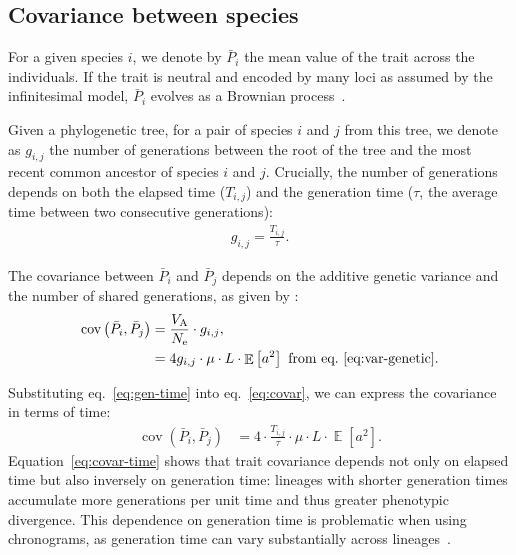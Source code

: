 \documentclass{article}
\newcommand{\Multiply}{\cdot}
\DeclareMathOperator{\E}{\mathbb{E}}
\DeclareMathOperator{\Cov}{\text{cov}}
\newcommand{\Ne}{N_{\text{e}}}
\newcommand{\Trait}{P}
\newcommand{\MutationRatePheno}{\mu}
\newcommand{\NbrLoci}{L}
\newcommand{\Spi}{i}
\newcommand{\Spj}{j}
\newcommand{\Time}{T}
\newcommand{\GenerationTime}{\tau}
\newcommand{\NbrGen}{g_{\Spi, \Spj}}
\newcommand{\VarGenetic}{V_{\mathrm{A}}}
\newcommand{\MeanTrait}{\bar{\Trait}}
\newcommand{\VarPhy}{\Cov \left( \MeanTrait_{\Spi}, \MeanTrait_{\Spj}\right)}
\newcommand{\GenArchi}{\NbrLoci \Multiply \E \left[ a^2 \right]}
\begin{document}
\subsection{Covariance between species}

For a given species $\Spi$, we denote by $\MeanTrait_{\Spi}$ the mean value of the trait across the individuals.
If the trait is neutral and encoded by many loci as assumed by the infinitesimal model, $\MeanTrait_{\Spi}$ evolves as a Brownian process~\citep{felsenstein_phylogenies_1985, hansen_translating_1996}.

Given a phylogenetic tree, for a pair of species $\Spi$ and $\Spj$ from this tree, we denote as $\NbrGen$ the number of generations between the root of the tree and the most recent common ancestor of species $\Spi$ and $\Spj$.
Crucially, the number of generations depends on both the elapsed time ($\Time_{\Spi, \Spj}$) and the generation time ($\GenerationTime$, the average time between two consecutive generations):
\begin{align}
    \NbrGen = \frac{\Time_{\Spi, \Spj}}{\GenerationTime}. \label{eq:gen-time}
\end{align}

The covariance between $\MeanTrait_{\Spi}$ and $\MeanTrait_{\Spj}$ depends on the additive genetic variance and the number of shared generations, as given by \citet{hansen_translating_1996}:
\begin{align}
    \VarPhy & = \frac{\VarGenetic}{\Ne} \Multiply \NbrGen, \\
    & = 4 \NbrGen \Multiply \MutationRatePheno \Multiply \GenArchi \text{ from eq.~\ref{eq:var-genetic}}. \label{eq:covar}
\end{align}

Substituting eq.~\ref{eq:gen-time} into eq.~\ref{eq:covar}, we can express the covariance in terms of time:
\begin{align}
    \VarPhy & = 4 \Multiply \frac{\Time_{\Spi, \Spj}}{\GenerationTime} \Multiply \MutationRatePheno \Multiply \GenArchi. \label{eq:covar-time}
\end{align}
Equation~\ref{eq:covar-time} shows that trait covariance depends not only on elapsed time but also inversely on generation time: lineages with shorter generation times accumulate more generations per unit time and thus greater phenotypic divergence.
This dependence on generation time is problematic when using chronograms, as generation time can vary substantially across lineages~\citep{demagalhaes_database_2009}.
\end{document}
